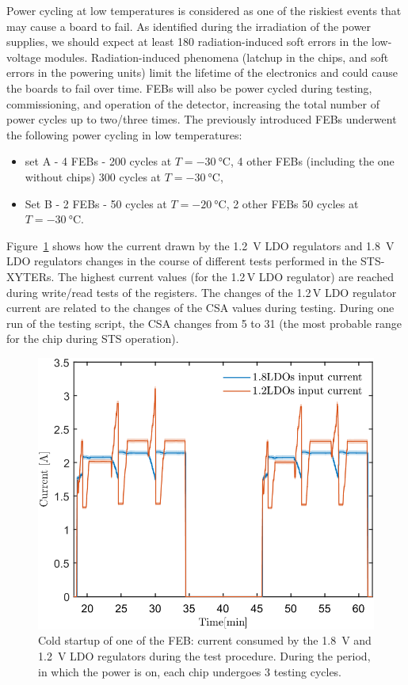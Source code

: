Power cycling at low temperatures is considered as one of the riskiest events that may cause a board to fail.  As identified during the irradiation of the power supplies, we should expect at least 180 radiation-induced soft errors in the low-voltage modules. Radiation-induced phenomena (latchup in the chips, and soft errors in the powering units) limit the lifetime of the electronics and could cause the boards to fail over time. \glspl{FEB} will also be power cycled during testing, commissioning, and operation of the detector, increasing the total number of power cycles up to two/three times. The previously introduced \glspl{FEB} underwent the following power cycling in low temperatures:
\begin{itemize}
    \item set A - 4 \glspl{FEB} - 200 cycles at $T = \SI{-30}{\celsius}$, 4 other \glspl{FEB} (including the one without chips) 300 cycles at $T = \SI{-30}{\celsius}$,
    \item Set B - 2 \glspl{FEB} - 50 cycles at $T = \SI{-20}{\celsius}$, 2 other \glspl{FEB} 50 cycles at $T = \SI{-30}{\celsius}$.
\end{itemize}
Figure~\ref{fig_power_cycle} shows how the current drawn by the 1.2~V \gls{LDO} regulators and 1.8~V \gls{LDO} regulators changes in the course of different tests performed in the STS-XYTERs. The highest current values (for the 1.2\,V LDO regulator) are reached during write/read tests of the registers. The changes of the 1.2\,V LDO regulator current are related to the changes of the \gls{CSA} values during testing. During one run of the testing script, the \gls{CSA} changes from 5 to 31 (the most probable range for the chip during STS operation). 
\begin{figure}[!h]
\centering
\includegraphics[width=0.6\columnwidth]{Chapter4/images/currents.png}
\caption{Cold startup of one of the \gls{FEB}: current consumed by the 1.8~V and 1.2~V \gls{LDO} regulators during the test procedure. During the period, in which the power is on, each chip undergoes 3 testing cycles.}
\label{fig_power_cycle}
\end{figure}
